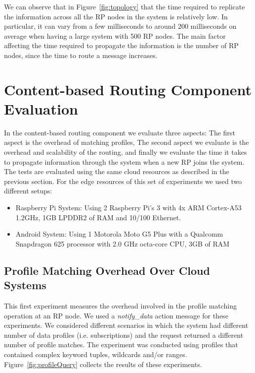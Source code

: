 We can observe that in Figure~\ref{fig:topology} that the time required to replicate the information across all the RP nodes in the system is relatively low. In particular, it can vary from a few milliseconds to around 200 milliseconds on average when having a large system with 500 RP nodes. The main factor affecting the time required to propagate the information is the number of RP nodes, since the time to route a message increases. 

\section{Content-based Routing Component Evaluation}

In the content-based routing component we evaluate three aspects: The first aspect is the overhead of matching profiles, The second aspect we evaluate is the overhead and scalability of the routing, and finally we evaluate the time it takes to propagate information through the system when a new RP joins the system. The tests are evaluated using the same cloud resources as described in the previous section. For the edge resources of this set of experiments we used two different setups:

\begin{itemize}
\item Raspberry Pi System: Using 2 Raspberry Pi's 3 with 4x ARM Cortex-A53 1.2GHz, 1GB LPDDR2 of RAM and 10/100 Ethernet.

\item Android System: Using 1 Motorola Moto G5 Plus with a Qualcomm Snapdragon 625 processor with 2.0 GHz octa-core CPU, 3GB of RAM
\end{itemize}

\subsection{Profile Matching Overhead Over Cloud Systems}

This first experiment measures the overhead involved in the profile matching operation at an RP node. We used a {\it notify\_data} action message for these experiments. We considered different scenarios in which the system had different number of data profiles (i.e. subscriptions) and the request returned a different number of profile matches. %
The experiment was conducted using profiles that contained complex keyword tuples, wildcards and/or ranges. Figure~\ref{fig:profileQuery} collects the results of these experiments. 

